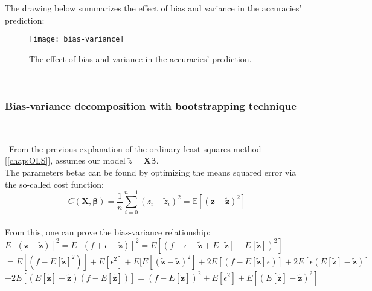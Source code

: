 The drawing below summarizes the effect of bias and variance in the accuracies' prediction: \\

\begin{figure}[h]
\label{fig:bias-variance}
\texttt{[image: bias-variance]}
\caption{The effect of bias and variance in the accuracies' prediction.}
\centering
\end{figure}\\

\subsubsection{Bias-variance decomposition with bootstrapping technique} \\
\label{chap:Bias-variance decomposition with bootstrapping technique}

\quad \, From the previous explanation of the ordinary least squares method [\autoref{chap:OLS}], assumes our model $\tilde{z} = \textbf{X}\boldsymbol{\beta}$. \\

The parameters betas can be found by optimizing the means squared error via the so-called cost function: \\

$$C(\boldsymbol{X},\boldsymbol{\beta}) =\frac{1}{n}\sum_{i=0}^{n-1}(z_i-\tilde{z}_i)^2=\mathbb{E}\left[(\boldsymbol{z}-\boldsymbol{\tilde{z}})^2\right]$$ \\

From this, one can prove the bias-variance relationship: \\

$E[(\boldsymbol{z} - \boldsymbol{\tilde{z}})]^{2} = E[(f + \epsilon - \boldsymbol{\tilde{z}})]^{2} = E[(f + \epsilon - \boldsymbol{\tilde{z}} + E[\boldsymbol{\tilde{z}}] - E[\boldsymbol{\tilde{z}}])^{2}]$ \\

$= E[(f - E[\boldsymbol{\tilde{z}}]^{2})] + E[\epsilon^{2}] + E[E[(\boldsymbol{\tilde{z}} - \boldsymbol{\tilde{z}})^{2}] + 
2E[(f - E[\boldsymbol{\tilde{z}}] \epsilon)] + 2E[\epsilon(E[\boldsymbol{\tilde{z}}] - \boldsymbol{\tilde{z}})]$ \\

$+ 2E[(E[\boldsymbol{\tilde{z}}] - \boldsymbol{\tilde{z}})(f-E[\boldsymbol{\tilde{z}}])] = (f - E[\boldsymbol{\tilde{z}}])^{2} + E[\epsilon^{2}] + E[(E[\boldsymbol{\tilde{z}}] - \boldsymbol{\tilde{z}})^{2}]$ \\

